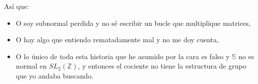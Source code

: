 \documentclass{article}
\begin{document}
	Así que:
	\begin{itemize}
		\item O soy subnormal perdida y no sé escribir un bucle que multiplique matrices,
		\item O hay algo que entiendo rematadamente mal y no me doy cuenta,
		\item O lo único de toda esta historia que he asumido por la cara es falso y $\mathbb{S}$ no es normal en $SL_2(\mathbb{Z})$, y entonces el cociente no tiene la estructura de grupo que yo andaba buscando.
	\end{itemize}
	\begin{center}
		\Laughey[1.4]
	\end{center}
\end{document}
